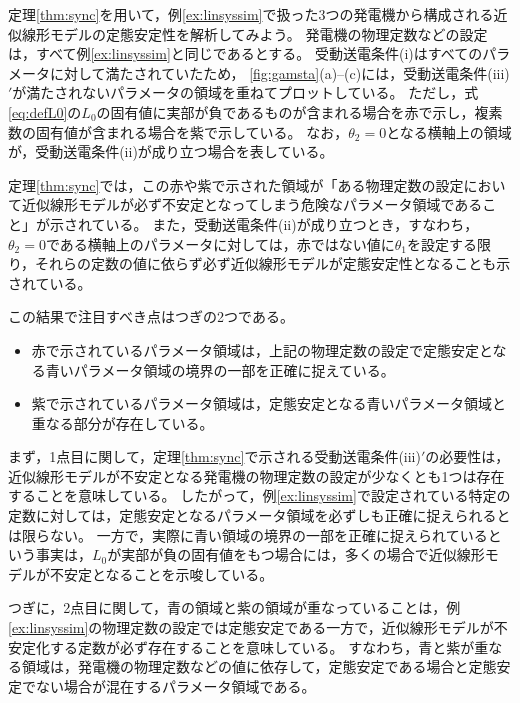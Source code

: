 \documentclass[tombow,dvipdfmx]{corona-a5-1.1}
\begin{document}
\begin{例}[受動送電条件に基づく定態安定性解析]\label{ex:linthm}
定理\ref{thm:sync}を用いて，例\ref{ex:linsyssim}で扱った3つの発電機から構成される近似線形モデルの定態安定性を解析してみよう。
発電機の物理定数などの設定は，すべて例\ref{ex:linsyssim}と同じであるとする。
受動送電条件(i)はすべてのパラメータに対して満たされていたため，
\ref{fig:gamsta}(a)--(c)には，受動送電条件(iii)$'$が満たされないパラメータの領域を重ねてプロットしている。
ただし，式\ref{eq:defL0}の$L_0$の固有値に実部が負であるものが含まれる場合を赤で示し，複素数の固有値が含まれる場合を紫で示している。
なお，$\theta_2=0$となる横軸上の領域が，受動送電条件(ii)が成り立つ場合を表している。

定理\ref{thm:sync}では，この赤や紫で示された領域が「ある物理定数の設定において近似線形モデルが必ず不安定となってしまう危険なパラメータ領域であること」が示されている。
また，受動送電条件(ii)が成り立つとき，すなわち，$\theta_2=0$である横軸上のパラメータに対しては，赤ではない値に$\theta_1$を設定する限り，それらの定数の値に依らず必ず近似線形モデルが定態安定性となることも示されている。

この結果で注目すべき点はつぎの2つである。
\begin{itemize}
\item 赤で示されているパラメータ領域は，上記の物理定数の設定で定態安定となる青いパラメータ領域の境界の一部を正確に捉えている。
\item 紫で示されているパラメータ領域は，定態安定となる青いパラメータ領域と重なる部分が存在している。
\end{itemize}
まず，1点目に関して，定理\ref{thm:sync}で示される受動送電条件(iii)$'$の必要性は，近似線形モデルが不安定となる発電機の物理定数の設定が少なくとも1つは存在することを意味している。
したがって，例\ref{ex:linsyssim}で設定されている特定の定数に対しては，定態安定となるパラメータ領域を必ずしも正確に捉えられるとは限らない。
一方で，実際に青い領域の境界の一部を正確に捉えられているという事実は，$L_0$が実部が負の固有値をもつ場合には，多くの場合で近似線形モデルが不安定となることを示唆している。

つぎに，2点目に関して，青の領域と紫の領域が重なっていることは，例\ref{ex:linsyssim}の物理定数の設定では定態安定である一方で，近似線形モデルが不安定化する定数が必ず存在することを意味している。
すなわち，青と紫が重なる領域は，発電機の物理定数などの値に依存して，定態安定である場合と定態安定でない場合が混在するパラメータ領域である。



\end{例}
\end{document}
